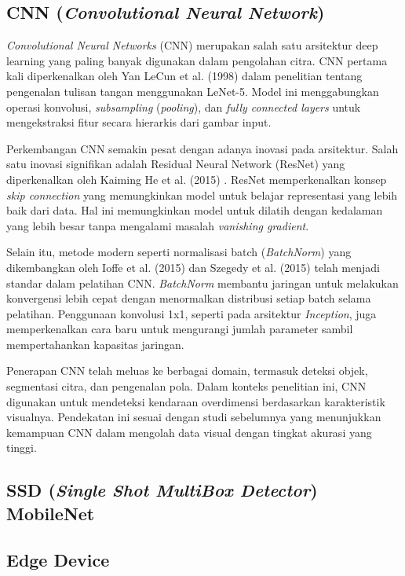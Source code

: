 \subsection{CNN (\emph{Convolutional Neural Network})}
\emph{Convolutional Neural Networks} (CNN) merupakan salah satu arsitektur deep learning yang paling banyak digunakan dalam pengolahan citra. CNN pertama kali diperkenalkan oleh Yan LeCun et al. (1998) \parencite*{yannlecun1998} dalam penelitian tentang pengenalan tulisan tangan menggunakan LeNet-5. Model ini menggabungkan operasi konvolusi, \emph{subsampling} (\emph{pooling}), dan \emph{fully connected layers} untuk mengekstraksi fitur secara hierarkis dari gambar input.

Perkembangan CNN semakin pesat dengan adanya inovasi pada arsitektur. Salah satu inovasi signifikan adalah Residual Neural Network (ResNet) yang diperkenalkan oleh Kaiming He et al. (2015) \parencite*{kaiminghe2015}. ResNet memperkenalkan konsep \emph{skip connection} yang memungkinkan model untuk belajar representasi yang lebih baik dari data. Hal ini memungkinkan model untuk dilatih dengan kedalaman yang lebih besar tanpa mengalami masalah \emph{vanishing gradient}.

Selain itu, metode modern seperti normalisasi batch (\emph{BatchNorm}) yang dikembangkan oleh Ioffe et al. (2015) \parencite*{ioffe2015} dan Szegedy et al. (2015) \parencite*{szegedy2015} telah menjadi standar dalam pelatihan CNN. \emph{BatchNorm} membantu jaringan untuk melakukan konvergensi lebih cepat dengan menormalkan distribusi setiap batch selama pelatihan. Penggunaan konvolusi 1x1, seperti pada arsitektur \emph{Inception}, juga memperkenalkan cara baru untuk mengurangi jumlah parameter sambil mempertahankan kapasitas jaringan.

Penerapan CNN telah meluas ke berbagai domain, termasuk deteksi objek, segmentasi citra, dan pengenalan pola. Dalam konteks penelitian ini, CNN digunakan untuk mendeteksi kendaraan overdimensi berdasarkan karakteristik visualnya. Pendekatan ini sesuai dengan studi sebelumnya yang menunjukkan kemampuan CNN dalam mengolah data visual dengan tingkat akurasi yang tinggi.

\subsection{SSD (\emph{Single Shot MultiBox Detector}) MobileNet}

\subsection{Edge Device}

